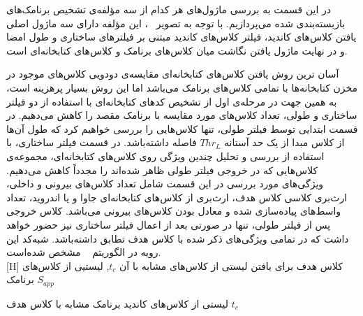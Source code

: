 در این قسمت به بررسی ماژول‌های هر کدام از سه مؤلفه‌ی تشخیص برنامک‌های بازبسته‌بندی شده می‌پردازیم.
با توجه به تصویر ~، این مؤلفه‌ دارای سه ماژول اصلی یافتن کلاس‌های کاندید، فیلتر کلاس‌های کاندید مبتنی بر فیلتر‌های ساختاری و طول امضا و در نهایت ماژول یافتن نگاشت میان کلاس‌های برنامک و کلاس‌های کتابخانه‌ای است.

آسان ‌ترین روش یافتن کلاس‌های کتابخانه‌ای مقایسه‌ی دودویی کلاس‌های موجود در مخزن کتابخانه‌ها با تمامی کلاس‌های برنامک می‌باشد اما این روش بسیار پرهزینه‌ است، به همین جهت در مرحله‌ی اول از تشخیص کد‌های کتابخانه‌ای با استفاده از دو فیلتر ساختاری و طولی، تعداد کلاس‌های مورد مقایسه با برنامک مقصد را کاهش می‌دهیم. در قسمت ابتدایی توسط فیلتر طولی، تنها کلاس‌هایی را بررسی خواهیم کرد که طول آن‌ها از کلاس مبدا از یک حد آستانه $Thr_L$ فاصله‌ داشته‌باشد. در قسمت فیلتر ساختاری، با استفاده از بررسی و تحلیل چندین ویژگی روی کلاس‌های کتابخانه‌ای، مجموعه‌ی کلاس‌هایی که در خروجی فیلتر طولی ظاهر شده‌اند را مجدداً کاهش می‌دهیم. ویژگی‌های مورد بررسی در این قسمت شامل تعداد کلاس‌های بیرونی و داخلی، ارث‌بری کلاسی کلاس هدف، ارث‌بری از کلاس‌های کتابخانه‌ای جاوا و یا اندروید، تعداد واسط‌های پیاده‌سازی شده و معادل بودن کلاس‌های بیرونی می‌باشد. کلاس خروجی پس از فیلتر طولی، تنها در صورتی بعد از اعمال فیلتر ساختاری نیز حضور خواهد داشت که در تمامی ویژگی‌های ذکر شده با کلاس هدف تطابق داشته‌باشد. شبه‌کد این رویه در الگوریتم ~ مشخص شده‌‌است. \\ 
[H]
\vspace{1em}
 کلاس هدف برای یافتن لیستی از کلاس‌های مشابه با آن $t_c$, لیستیی از کلاس‌های برنامک $S_{app}$

 لیستی از کلاس‌های کاندید برنامک مشابه با کلاس هدف $t_c$

